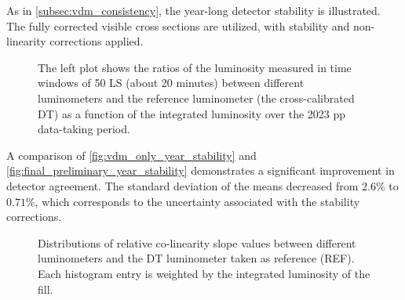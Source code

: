 As in \autoref{subsec:vdm_consistency}, the year-long detector stability is illustrated. The fully corrected visible cross sections are utilized, with stability and non-linearity corrections applied.

\begin{figure}[!htb]
    \centering
    \caption[Final full year stability]{The left plot shows the ratios of the luminosity measured in time windows of 50 LS (about 20 minutes) between different luminometers and the reference luminometer (the cross-calibrated DT) as a function of the integrated luminosity over the 2023 pp data-taking period.}
    \label{fig:final_preliminary_year_stability}
\end{figure}

A comparison of \autoref{fig:vdm_only_year_stability} and \autoref{fig:final_preliminary_year_stability} demonstrates a significant improvement in detector agreement. The standard deviation of the means decreased from $2.6\%$ to $0.71\%$, which corresponds to the uncertainty associated with the stability corrections.

\begin{figure}[!htb]
    \centering
    \caption[Residual relative non-linearity distributions]{Distributions of relative co-linearity slope values between different luminometers and the DT luminometer taken as reference (REF). Each histogram entry is weighted by the integrated luminosity of the fill.}
    \label{fig:year_slopes_final}
\end{figure}

